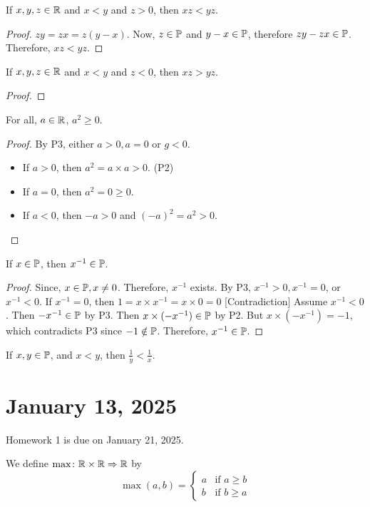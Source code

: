 \documentclass[11pt]{article}
\begin{document}
\begin{proposition}
	If \(x, y, z \in \mathbb R\) and \(x < y\) and \(z > 0\), then \(xz < yz\).
\end{proposition}

\begin{proof}
	\(zy = zx = z(y - x) \). Now, \(z \in \mathbb P\) and \(y - x \in \mathbb P\), therefore \(zy - zx \in \mathbb P\). Therefore, \(xz < yz\).
\end{proof}
\begin{corollary}
	If \(x, y, z \in \mathbb R\) and \(x < y\) and \(z < 0\), then \(xz > yz\).
\end{corollary}
\begin{proof}

\end{proof}
\begin{corollary}
	For all, \(a \in \mathbb R\), \(a^2 \geq 0\).
\end{corollary}
\begin{proof}
	By P3, either \(a > 0, a = 0\) or \(g < 0\).
	\begin{itemize}
		\item If \(a > 0\), then \(a^2 = a \times a > 0\). \hfill(P2)
		\item If \(a = 0\), then \(a^2 = 0 \geq 0\).
		\item If \(a < 0\), then \(-a > 0\) and \((-a)^2 = a^2 > 0\).
	\end{itemize}
\end{proof}

\begin{proposition}
	If \(x \in \mathbb P\), then \(x^{-1} \in \mathbb P \).
\end{proposition}
\begin{proof}
	Since, \(x \in \mathbb P, x \neq 0\). Therefore, \(x^{-1}\) exists. By P3, \(x^{-1} > 0, x^{-1} = 0  \), or \(x^{-1} < 0\).
	If \(x^{-1} = 0\), then \(1 = x \times x^{-1} = x \times 0 = 0\)
	[Contradiction] Assume \(x^{-1} < 0\). Then \(-x^{-1} \in \mathbb P\) by P3. Then \(x
	\times (-x^{-1}) \in \mathbb P\) by P2. But \(x \times (-x^{-1}) = -1\), which
	contradicts P3 since \(-1 \notin \mathbb P\). Therefore, \(x^{-1} \in \mathbb P\).
\end{proof}
\begin{corollary}
	If \(x, y \in \mathbb P\), and \(x < y\), then \(\frac{1}{y} < \frac{1}{x}\).
\end{corollary}

\section{January 13, 2025}
Homework 1 is due on January 21, 2025.\\
\begin{definition}
	We define \(\max \colon \mathbb R \times \mathbb R \Rightarrow \mathbb R\) by \[\max(a, b) = \begin{cases}
			a & \text{if } a \geq b \\
			b & \text{if } b \geq a
		\end{cases}\]
\end{definition}
\end{document}
